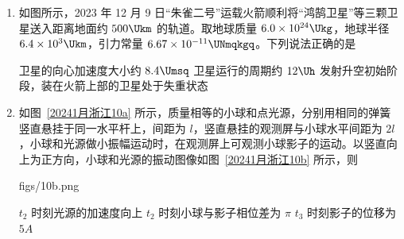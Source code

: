 \documentclass[\gkver]{gaokaozhenti}
\begin{document}
\begin{enumerate}
{落到桶底 A 点时
$x + \frac{D}{2} = v_{0}\sqrt{\frac{2\cdot 2h}{g}}$

解得 $v_{0} = \frac{(\sqrt{2} + 1)D}{2}\sqrt{\frac{g}{2h}}$

故选 C。
}

\item
如图所示，2023 年 12 月 9 日“朱雀二号”运载火箭顺利将“鸿鹄卫星”等三颗卫星送入距离地面约 $500\Ukm$ 的轨道。取地球质量 $6.0\times10^{24}\Ukg$，地球半径 $6.4\times10^{3}\Ukm$，引力常量 $6.67\times10^{-11}\UNmqkgq$。下列说法正确的是


{卫星的向心加速度大小约 $8.4\Umsq$}
{卫星运行的周期约 $12\Uh$}
{发射升空初始阶段，装在火箭上部的卫星处于失重状态}


\item
如图~\ref{20241月浙江10a} 所示，质量相等的小球和点光源，分别用相同的弹簧竖直悬挂于同一水平杆上，间距为 $l$，竖直悬挂的观测屏与小球水平间距为 $2l$，小球和光源做小振幅运动时，在观测屏上可观测小球影子的运动。以竖直向上为正方向，小球和光源的振动图像如图~\ref{20241月浙江10b} 所示，则

{figs/10b.png}

{$t_{2}$ 时刻光源的加速度向上}
{$t_{2}$ 时刻小球与影子相位差为 $\pi$}
{$t_{3}$ 时刻影子的位移为 $5A$}


\end{enumerate}
\end{document}
